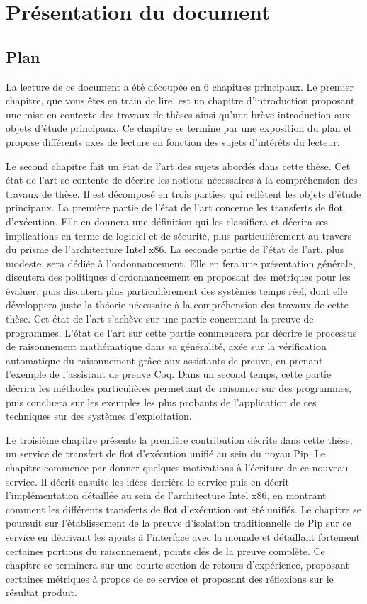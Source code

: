 \section{Présentation du document}

\subsection{Plan}

La lecture de ce document a été découpée en 6 chapitres principaux. Le premier chapitre, que vous êtes en train de lire, est un chapitre d'introduction proposant une mise en contexte des travaux de thèses ainsi qu'une brève introduction aux objets d'étude principaux. Ce chapitre se termine par une exposition du plan et propose différents axes de lecture en fonction des sujets d'intérêts du lecteur.

Le second chapitre fait un état de l'art des sujets abordés dans cette thèse. Cet état de l'art se contente de décrire les notions nécessaires à la compréhension des travaux de thèse. Il est décomposé en trois parties, qui reflètent les objets d'étude principaux. La première partie de l'état de l'art concerne les transferts de flot d'exécution. Elle en donnera une définition qui les classifiera et décrira ses implications en terme de logiciel et de sécurité, plus particulièrement au travers du prisme de l'architecture Intel x86. La seconde partie de l'état de l'art, plus modeste, sera dédiée à l'ordonnancement. Elle en fera une présentation générale, discutera des politiques d'ordonnancement en proposant des métriques pour les évaluer, puis discutera plus particulièrement des systèmes temps réel, dont elle développera juste la théorie nécessaire à la compréhension des travaux de cette thèse. Cet état de l'art s'achève sur une partie concernant la preuve de programmes. L'état de l'art sur cette partie commencera par décrire le processus de raisonnement mathématique dans sa généralité, axée sur la vérification automatique du raisonnement grâce aux assistants de preuve, en prenant l'exemple de l'assistant de preuve Coq. Dans un second temps, cette partie décrira les méthodes particulières permettant de raisonner sur des programmes, puis concluera sur les exemples les plus probants de l'application de ces techniques sur des systèmes d'exploitation.

Le troisième chapitre présente la première contribution décrite dans cette thèse, un service de transfert de flot d'exécution unifié au sein du noyau Pip. Le chapitre commence par donner quelques motivations à l'écriture de ce nouveau service. Il décrit ensuite les idées derrière le service puis en décrit l'implémentation détaillée au sein de l'architecture Intel x86, en montrant comment les différents transferts de flot d'exécution ont été unifiés. Le chapitre se poursuit sur l'établissement de la preuve d'isolation traditionnelle de Pip sur ce service en décrivant les ajouts à l'interface avec la monade et détaillant fortement certaines portions du raisonnement, points clés de la preuve complète. Ce chapitre se terminera sur une courte section de retours d'expérience, proposant certaines métriques à propos de ce service et proposant des réflexions sur le résultat produit. 

